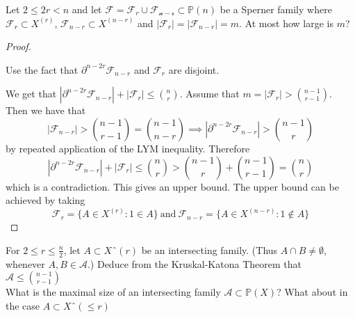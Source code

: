 \documentclass[a4paper]{article}
\newcommand{\shadow}{\partial}
\renewcommand{\P}{\mathbb{P}}
\renewcommand{\F}{\mathcal{F}}
\begin{document}
\begin{question}[Question 4]
  Let $2 \leq 2r < n$ and let $\mathcal{F} = \mathcal{F}_r \cup
  \mathcal{F_{n-r}} \subset \P(n)$ be a Sperner family where $\mathcal{F}_r
  \subset X^{(r)}$, $\mathcal{F}_{n-r} \subset X^{(n-r)}$ and
  $|\mathcal{F}_r| = |\mathcal{F}_{n-r}| = m$. At most how large is $m$?
\end{question}
\begin{proof}
  \begin{idea}
    Use the fact that $\shadow^{n-2r}{\mathcal{F}_{n-r}}$ and $\mathcal{F}_r$
    are disjoint.
  \end{idea}
  We get that $|\shadow^{n-2r}{\mathcal{F}_{n-r}}| + |\mathcal{F}_r| \leq {n
    \choose r}$.
  Assume that $m = |\mathcal{F}_{r}| > \binom{n-1}{r-1}$. Then we have that
  \[|\mathcal{F}_{n-r}| > \binom{n-1}{r-1} = \binom{n-1}{n-r} \implies
    |\shadow^{n-2r}{\mathcal{F}_{n-r}}| > \binom{n-1}{r}\]
  by repeated application of the LYM inequality. Therefore
  \[|\shadow^{n-2r}{\mathcal{F}_{n-r}}| + |\mathcal{F}_r| \leq {n
      \choose r} > \binom{n-1}{r} + \binom{n-1}{r-1} = \binom{n}{r}\]
  which is a contradiction. This gives an upper bound. The upper bound can be
  achieved by taking
  \[\F_r = \{A \in X^{(r)}: 1 \in A\} \ \text{and} \ \F_{n-r} = \{A \in X^{(n-r)}  : 1 \not\in A\} \]
\end{proof}

\begin{question}[Question 5]
  For $2 \leq r \leq \frac{n}{2}$, let $A \subset Xˆ{(r)}$ be an intersecting
  family. (Thus $A \cap B \neq \emptyset$, whenever $A, B \in \mathcal{A}$.)
  Deduce from the Kruskal-Katona Theorem that $\mathcal{A} \leq
  \binom{n-1}{r-1}$\\
  What is the maximal size of an intersecting family $\mathcal{A} \subset
  \P(X)$? What about in the case $A \subset Xˆ{(\leq r)}$
\end{question}
\end{document}
